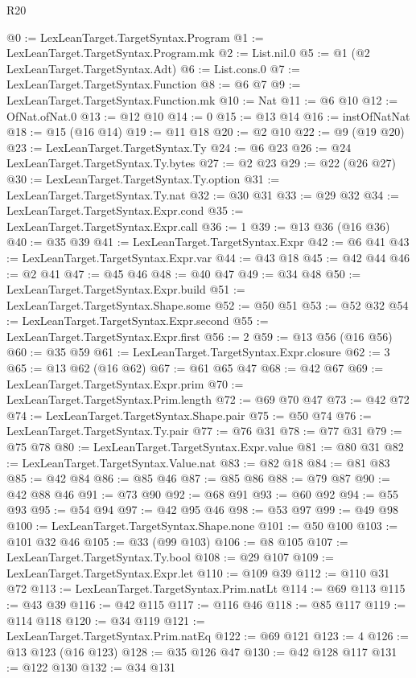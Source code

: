 \begin{lexlean}{R20}
\begin{coremodule}
@0 := LexLeanTarget.TargetSyntax.Program
@1 := LexLeanTarget.TargetSyntax.Program.mk
@2 := List.nil.{0}
@5 := @1 (@2 LexLeanTarget.TargetSyntax.Adt)
@6 := List.cons.{0}
@7 := LexLeanTarget.TargetSyntax.Function
@8 := @6 @7
@9 := LexLeanTarget.TargetSyntax.Function.mk
@10 := Nat
@11 := @6 @10
@12 := OfNat.ofNat.{0}
@13 := @12 @10
@14 := 0
@15 := @13 @14
@16 := instOfNatNat
@18 := @15 (@16 @14)
@19 := @11 @18
@20 := @2 @10
@22 := @9 (@19 @20)
@23 := LexLeanTarget.TargetSyntax.Ty
@24 := @6 @23
@26 := @24 LexLeanTarget.TargetSyntax.Ty.bytes
@27 := @2 @23
@29 := @22 (@26 @27)
@30 := LexLeanTarget.TargetSyntax.Ty.option
@31 := LexLeanTarget.TargetSyntax.Ty.nat
@32 := @30 @31
@33 := @29 @32
@34 := LexLeanTarget.TargetSyntax.Expr.cond
@35 := LexLeanTarget.TargetSyntax.Expr.call
@36 := 1
@39 := @13 @36 (@16 @36)
@40 := @35 @39
@41 := LexLeanTarget.TargetSyntax.Expr
@42 := @6 @41
@43 := LexLeanTarget.TargetSyntax.Expr.var
@44 := @43 @18
@45 := @42 @44
@46 := @2 @41
@47 := @45 @46
@48 := @40 @47
@49 := @34 @48
@50 := LexLeanTarget.TargetSyntax.Expr.build
@51 := LexLeanTarget.TargetSyntax.Shape.some
@52 := @50 @51
@53 := @52 @32
@54 := LexLeanTarget.TargetSyntax.Expr.second
@55 := LexLeanTarget.TargetSyntax.Expr.first
@56 := 2
@59 := @13 @56 (@16 @56)
@60 := @35 @59
@61 := LexLeanTarget.TargetSyntax.Expr.closure
@62 := 3
@65 := @13 @62 (@16 @62)
@67 := @61 @65 @47
@68 := @42 @67
@69 := LexLeanTarget.TargetSyntax.Expr.prim
@70 := LexLeanTarget.TargetSyntax.Prim.length
@72 := @69 @70 @47
@73 := @42 @72
@74 := LexLeanTarget.TargetSyntax.Shape.pair
@75 := @50 @74
@76 := LexLeanTarget.TargetSyntax.Ty.pair
@77 := @76 @31
@78 := @77 @31
@79 := @75 @78
@80 := LexLeanTarget.TargetSyntax.Expr.value
@81 := @80 @31
@82 := LexLeanTarget.TargetSyntax.Value.nat
@83 := @82 @18
@84 := @81 @83
@85 := @42 @84
@86 := @85 @46
@87 := @85 @86
@88 := @79 @87
@90 := @42 @88 @46
@91 := @73 @90
@92 := @68 @91
@93 := @60 @92
@94 := @55 @93
@95 := @54 @94
@97 := @42 @95 @46
@98 := @53 @97
@99 := @49 @98
@100 := LexLeanTarget.TargetSyntax.Shape.none
@101 := @50 @100
@103 := @101 @32 @46
@105 := @33 (@99 @103)
@106 := @8 @105
@107 := LexLeanTarget.TargetSyntax.Ty.bool
@108 := @29 @107
@109 := LexLeanTarget.TargetSyntax.Expr.let
@110 := @109 @39
@112 := @110 @31 @72
@113 := LexLeanTarget.TargetSyntax.Prim.natLt
@114 := @69 @113
@115 := @43 @39
@116 := @42 @115
@117 := @116 @46
@118 := @85 @117
@119 := @114 @118
@120 := @34 @119
@121 := LexLeanTarget.TargetSyntax.Prim.natEq
@122 := @69 @121
@123 := 4
@126 := @13 @123 (@16 @123)
@128 := @35 @126 @47
@130 := @42 @128 @117
@131 := @122 @130
@132 := @34 @131

\end{coremodule}
\end{lexlean}
